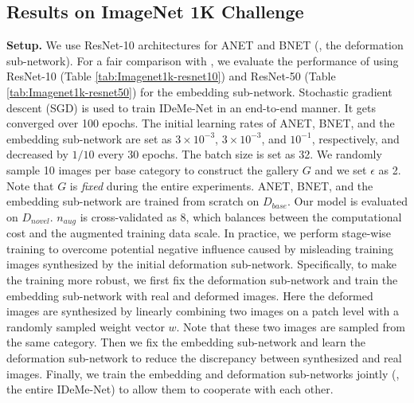 \documentclass[10pt,letterpaper,twocolumn]{article}
\begin{document}
\subsection{Results on ImageNet 1K Challenge\label{subsec:Results-on-ImageNet1k}}

\noindent \textbf{Setup.} We use ResNet-10 architectures for ANET
and BNET (\ie, the deformation sub-network). For a fair comparison with \cite{2017ICCVaug,imaginaryData}, we evaluate
the performance of using ResNet-10 (Table \ref{tab:Imagenet1k-resnet10})
and ResNet-50 (Table \ref{tab:Imagenet1k-resnet50}) for the embedding
sub-network. Stochastic gradient descent (SGD) is used to train IDeMe-Net
in an end-to-end manner. It gets converged over 100 epochs. The initial
learning rates of ANET, BNET, and the embedding sub-network are set as
$3\times10^{-3}$, $3\times10^{-3}$, and $10^{-1}$, respectively,
and decreased by $1/10$ every 30 epochs. The batch size is set as
32. We randomly sample 10 images per base category to construct the
gallery $G$ and we set $\epsilon$ as 2. Note that $G$ is \emph{fixed}
during the entire experiments. ANET, BNET, and the embedding sub-network
are trained from scratch on $D_{base}$. Our model is evaluated on
$D_{novel}$. $n_{aug}$ is cross-validated as 8, which balances between
the computational cost and the augmented training data scale. In practice, we perform stage-wise training to overcome potential negative influence caused by misleading training images synthesized by the initial deformation sub-network. Specifically, to make the training more robust, we first fix the deformation sub-network and train the embedding sub-network with real and deformed images. Here the deformed images are synthesized by linearly combining two images on a patch level with a randomly sampled weight vector $w$. Note that these two images are sampled from the same category. Then we fix the embedding sub-network and learn the deformation sub-network to reduce the discrepancy between synthesized and real images. Finally, we train the embedding and deformation sub-networks jointly (\ie, the entire IDeMe-Net) to allow them to cooperate with each other.
\end{document}
